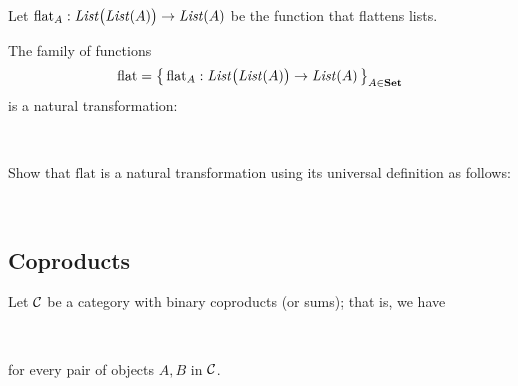 \begin{example}
Let $\text{flat}_A : \mathit{List}\big(\mathit{List}(A)\big) \to \mathit{List}(A)$ be the
function that flattens lists.

The family of functions
\[
  \text{flat} 
  = \big\{ \, 
      \text{flat}_A: \mathit{List}\big(\mathit{List}(A)\big) \to \mathit{List}(A) 
    \, \big\}_{A \in \mathbf {Set}}
\]
is a natural transformation:
\begin{center}
    \\[3mm]
\end{center}
\end{example}

\begin{exercise}
Show that $\text{flat}$ is a natural transformation using its universal
definition as follows:
\begin{center}
    \\[3mm]
\end{center}
\end{exercise}

\subsection{Coproducts}

Let $\mathcal{C}$ be a category with binary coproducts (or sums); that is, we
have 
\begin{center}
    \\[3mm]
\end{center}
for every pair of objects $A,B$ in $\mathcal{C}$.

